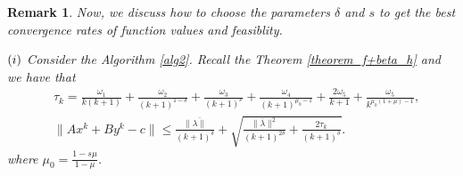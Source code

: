 \documentclass{article}
\numberwithin{equation}{section}
\newtheorem{remark}{Remark}[theorem]
\begin{document}
\begin{remark}
    Now, we discuss how to choose the parameters $\delta$ and $s$ to get the best convergence rates of 
function values and feasiblity. 

$(\romannumeral1)$ Consider the Algorithm \ref{alg2}. 
Recall the Theorem \ref{theorem_f+beta_h} and we have that 
\begin{align}
    &\tau_k = \frac{\omega_1}{k(k+1)}+ \frac{\omega_2}{(k+1)^{1-\delta}}+ \frac{\omega_3}{(k+1)^{\nu}} 
    + \frac{\omega_4}{(k+1)^{\mu_0-1}}+ \frac{2\omega_5}{k+1}+ \frac{\omega_5}{k^{\mu_0(1+\mu)-1}}, \nonumber \\
    &\|Ax^k+By^k-c\rVert \leq \frac{\|\bar{\lambda\rVert}}{(k+1)^{\delta}}+\sqrt{\frac{\|\bar{\lambda}\rVert^2}{(k+1)^{2\delta}}+\frac{2\tau_k}{(k+1)^{\delta}}}. \nonumber
\end{align}
where $\mu_0 = \frac{1-s\mu}{1-\mu}$. 


\end{remark}
\end{document}
